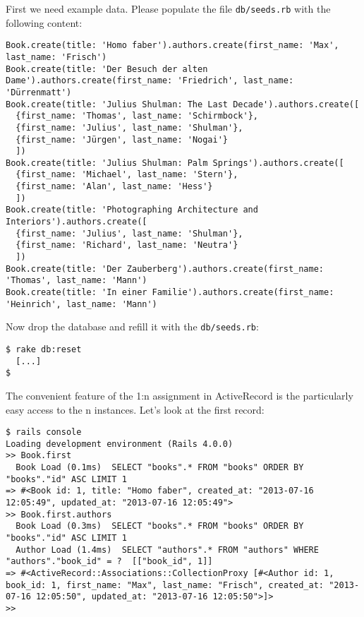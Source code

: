 \documentclass[a4paper]{book}
\newcounter{tab}[chapter]
\begin{document}
First we need example data. Please populate the file \texttt{db/seeds.rb} with the following content:

\begin{shaded}\begin{verbatim}
Book.create(title: 'Homo faber').authors.create(first_name: 'Max', last_name: 'Frisch')
Book.create(title: 'Der Besuch der alten Dame').authors.create(first_name: 'Friedrich', last_name: 'Dürrenmatt')
Book.create(title: 'Julius Shulman: The Last Decade').authors.create([
  {first_name: 'Thomas', last_name: 'Schirmbock'},
  {first_name: 'Julius', last_name: 'Shulman'},
  {first_name: 'Jürgen', last_name: 'Nogai'}
  ])
Book.create(title: 'Julius Shulman: Palm Springs').authors.create([
  {first_name: 'Michael', last_name: 'Stern'},
  {first_name: 'Alan', last_name: 'Hess'}
  ])
Book.create(title: 'Photographing Architecture and Interiors').authors.create([
  {first_name: 'Julius', last_name: 'Shulman'},
  {first_name: 'Richard', last_name: 'Neutra'}
  ])
Book.create(title: 'Der Zauberberg').authors.create(first_name: 'Thomas', last_name: 'Mann')
Book.create(title: 'In einer Familie').authors.create(first_name: 'Heinrich', last_name: 'Mann')
\end{verbatim}\end{shaded}

Now drop the database and refill it with the \texttt{db/seeds.rb}:

\begin{shaded}\begin{verbatim}
$ rake db:reset
  [...]
$
\end{verbatim}\end{shaded}

The convenient feature of the 1:n assignment in ActiveRecord is the particularly easy access to the n instances. Let's look at the first record:

\begin{shaded}\begin{verbatim}
$ rails console
Loading development environment (Rails 4.0.0)
>> Book.first
  Book Load (0.1ms)  SELECT "books".* FROM "books" ORDER BY "books"."id" ASC LIMIT 1
=> #<Book id: 1, title: "Homo faber", created_at: "2013-07-16 12:05:49", updated_at: "2013-07-16 12:05:49">
>> Book.first.authors
  Book Load (0.3ms)  SELECT "books".* FROM "books" ORDER BY "books"."id" ASC LIMIT 1
  Author Load (1.4ms)  SELECT "authors".* FROM "authors" WHERE "authors"."book_id" = ?  [["book_id", 1]]
=> #<ActiveRecord::Associations::CollectionProxy [#<Author id: 1, book_id: 1, first_name: "Max", last_name: "Frisch", created_at: "2013-07-16 12:05:50", updated_at: "2013-07-16 12:05:50">]>
>>
\end{verbatim}\end{shaded}
\end{document}
